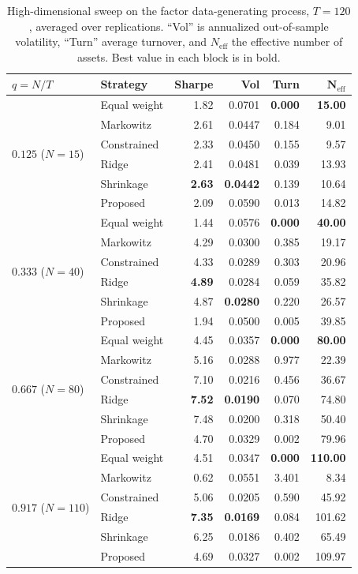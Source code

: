 \documentclass[11pt]{article}
\newcommand{\Neff}{N_{\mathrm{eff}}}
\begin{document}
\begin{table}[htbp]
\centering
\caption{High-dimensional sweep on the factor data-generating process, $T=120$,
  averaged over replications. ``Vol'' is annualized out-of-sample volatility,
  ``Turn'' average turnover, and $\Neff$ the effective number of assets. Best
  value in each block is in bold.}
\label{tab:nt}
\small
\begin{tabular}{llrrrr}
\toprule
$q=N/T$ & \textbf{Strategy} & \textbf{Sharpe} & \textbf{Vol} & \textbf{Turn} & $\boldsymbol{\Neff}$ \\
\midrule
\multirow{6}{*}{$0.125$ ($N=15$)}
 & Equal weight  & 1.82 & 0.0701 & \textbf{0.000} & \textbf{15.00} \\
 & Markowitz     & 2.61 & 0.0447 & 0.184 & 9.01 \\
 & Constrained   & 2.33 & 0.0450 & 0.155 & 9.57 \\
 & Ridge         & 2.41 & 0.0481 & 0.039 & 13.93 \\
 & Shrinkage     & \textbf{2.63} & \textbf{0.0442} & 0.139 & 10.64 \\
 & Proposed      & 2.09 & 0.0590 & 0.013 & 14.82 \\
\midrule
\multirow{6}{*}{$0.333$ ($N=40$)}
 & Equal weight  & 1.44 & 0.0576 & \textbf{0.000} & \textbf{40.00} \\
 & Markowitz     & 4.29 & 0.0300 & 0.385 & 19.17 \\
 & Constrained   & 4.33 & 0.0289 & 0.303 & 20.96 \\
 & Ridge         & \textbf{4.89} & 0.0284 & 0.059 & 35.82 \\
 & Shrinkage     & 4.87 & \textbf{0.0280} & 0.220 & 26.57 \\
 & Proposed      & 1.94 & 0.0500 & 0.005 & 39.85 \\
\midrule
\multirow{6}{*}{$0.667$ ($N=80$)}
 & Equal weight  & 4.45 & 0.0357 & \textbf{0.000} & \textbf{80.00} \\
 & Markowitz     & 5.16 & 0.0288 & 0.977 & 22.39 \\
 & Constrained   & 7.10 & 0.0216 & 0.456 & 36.67 \\
 & Ridge         & \textbf{7.52} & \textbf{0.0190} & 0.070 & 74.80 \\
 & Shrinkage     & 7.48 & 0.0200 & 0.318 & 50.40 \\
 & Proposed      & 4.70 & 0.0329 & 0.002 & 79.96 \\
\midrule
\multirow{6}{*}{$0.917$ ($N=110$)}
 & Equal weight  & 4.51 & 0.0347 & \textbf{0.000} & \textbf{110.00} \\
 & Markowitz     & 0.62 & 0.0551 & 3.401 & 8.34 \\
 & Constrained   & 5.06 & 0.0205 & 0.590 & 45.92 \\
 & Ridge         & \textbf{7.35} & \textbf{0.0169} & 0.084 & 101.62 \\
 & Shrinkage     & 6.25 & 0.0186 & 0.402 & 65.49 \\
 & Proposed      & 4.69 & 0.0327 & 0.002 & 109.97 \\
\bottomrule
\end{tabular}
\end{table}
\end{document}
